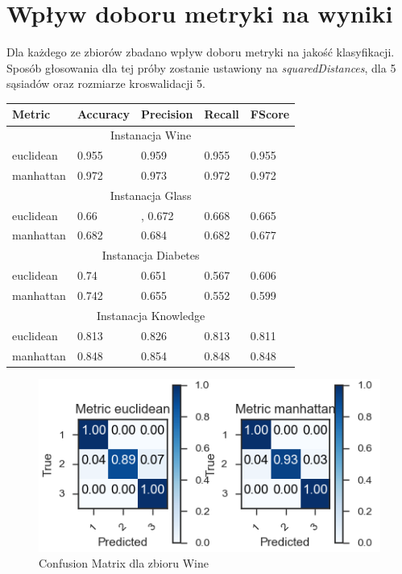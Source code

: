 \documentclass[12pt,a4paper]{article}
\begin{document}
\section{Wpływ doboru metryki na wyniki}

Dla każdego ze zbiorów zbadano wpływ doboru metryki na jakość klasyfikacji. Sposób głosowania dla tej próby zostanie ustawiony na \textit{squaredDistances}, dla 5 sąsiadów oraz rozmiarze kroswalidacji 5.\\
\begin{tabular}{ |p{2.5cm}||p{2.5cm}|p{2.5cm}|p{2.5cm}|p{2.5cm}| }
\hline
Metric &Accuracy & Precision & Recall & FScore \\
\hline
\multicolumn{5}{|c|}{Instanacja Wine}\\
\hline
euclidean & 0.955 & 0.959 & 0.955 & 0.955\\
manhattan & 0.972 & 0.973 & 0.972 & 0.972\\
\hline
\multicolumn{5}{|c|}{Instanacja Glass}\\ 
\hline
euclidean & 0.66 &, 0.672 & 0.668 & 0.665\\
manhattan & 0.682 & 0.684 & 0.682 & 0.677\\
\hline
\multicolumn{5}{|c|}{Instanacja Diabetes}\\  
\hline
euclidean & 0.74 & 0.651 & 0.567 & 0.606\\
manhattan & 0.742 & 0.655 & 0.552 & 0.599\\
\hline
\multicolumn{5}{|c|}{Instanacja Knowledge}\\  
\hline
euclidean & 0.813 & 0.826 & 0.813 & 0.811\\
manhattan & 0.848 & 0.854 & 0.848 & 0.848\\
\hline
\end{tabular}

\begin{figure}[H]
\centering
\includegraphics[width=1\textwidth]{MetricsWine.PNG}
\caption{Confusion Matrix dla zbioru Wine}
\end{figure}
\end{document}

